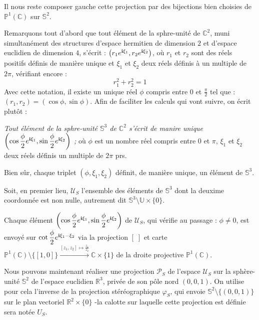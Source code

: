 \par
Il nous reste  composer  gauche cette projection par des bijections bien choisies de $\mathbb{P}^1(\mathbb{C})$ sur $\mathbb{S}^2$.

\par
Remarquons tout d'abord que tout \'el\'ement de la sphre-unit\'e de $\mathbb{C}^2$, muni simultan\'ement des structures d'espace hermitien de dimension $2$ et d'espace euclidien de dimension $4$, %
s'\'ecrit : $\left(r_1e^{\mathbf{i}\xi_1},r_2e^{\mathbf{i}\xi_2}\right)$, %
o\`u $r_1$ et $r_2$ sont des r\'eels positifs d\'efinis de mani\`ere unique et $\xi_1$ et $\xi_2$ deux r\'eels d\'efinis \`a un multiple de $2\pi$, v\'erifiant encore :
\[r_1^2+r_2^2=1\]
Avec cette notation, il existe un unique r\'eel $\phi$ compris entre $0$ et $\frac{\pi}{2}$ tel que : $(r_1,r_2)=(\cos\phi , \sin\phi)$. %
Afin de faciliter les calculs qui vont suivre, on \'ecrit plut\^ot :

\par
\emph{Tout \'el\'ement de la sphre-unit\'e $\mathbb{S}^3$ de $\mathbb{C}^2$ s'\'ecrit de manire unique $\left(\cos\dfrac{\phi}{2}e^{\mathbf{i}\xi_1},\sin\dfrac{\phi}{2}e^{\mathbf{i}\xi_2}\right)$ ;} %
o\`u $\phi$ est un nombre r\'eel compris entre $0$ et $\pi$, $\xi_1$ et $\xi_2$ deux r\'eels d\'efinis  un multiple de $2\pi$ prs.

\par
Bien s\^ur, chaque triplet $(\phi,\xi_1,\xi_2)$ d\'efinit, de mani\`ere unique, un \'el\'ement de $\mathbb{S}^3$.

\ligneinter
Soit, en premier lieu, $\mathcal{U}_S$ l'ensemble des \'el\'ements de $\mathbb{S}^3$ dont la deuxime coordonn\'ee est non nulle, %
autrement dit $\mathbb{S}^3\setminus\mathbb{U}\times\{0\}$.

\par
Chaque \'el\'ement $\left(\cos\dfrac{\phi}{2}e^{\mathbf{i}\xi_1},\sin\dfrac{\phi}{2}e^{\mathbf{i}\xi_2}\right)$ de $\mathcal{U}_S$, qui v\'erifie au passage : %
\boldmath$\phi\neq 0$\unboldmath, est envoy\'e sur $\cot\dfrac{\phi}{2}e^{\mathbf{i}\xi_1-\xi_2}$ via la projection $[\;]$ %
et carte $\mathbb{P}^1(\mathbb{C})\setminus\{[1,0]\}\xrightarrow{[z_1,z_2] \mapsto \frac{z_1}{z_2}}\mathbb{C}\times\{1\}$ de la droite projective $\mathbb{P}^1(\mathbb{C})$.

\par
Nous pouvons maintenant r\'ealiser une projection $\mathcal{P}_S$ de l'espace $\mathcal{U}_S$ sur la sph\`ere-unit\'e $\mathbb{S}^2$ de l'espace euclidien $\mathbb{R}^3$, priv\'ee de son p\^ole nord $(0,0,1)$. %
On utilise pour cela l'inverse de la projection st\'er\'eographique $\varphi_S$, qui envoie $\mathbb{S}^2\setminus\{(0,0,1)\}$ sur le plan vectoriel $\mathbb{R}^2\times\{0\}$ %
-la calotte sur laquelle cette projection est d\'efinie sera not\'ee $U_S$.
%
%


